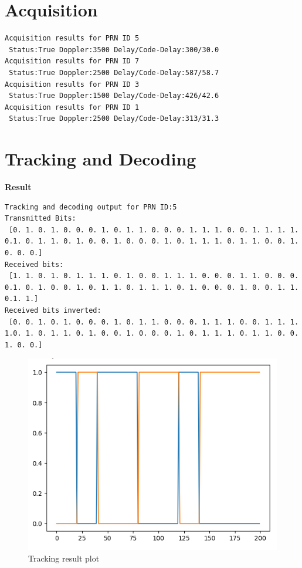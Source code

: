 
\section{Acquisition}

\begin{lstlisting}
Acquisition results for PRN ID 5
 Status:True Doppler:3500 Delay/Code-Delay:300/30.0
Acquisition results for PRN ID 7
 Status:True Doppler:2500 Delay/Code-Delay:587/58.7
Acquisition results for PRN ID 3
 Status:True Doppler:1500 Delay/Code-Delay:426/42.6
Acquisition results for PRN ID 1
 Status:True Doppler:2500 Delay/Code-Delay:313/31.3
\end{lstlisting}
\newpage
\section{Tracking and Decoding}
\textbf{Result}
\begin{lstlisting}
Tracking and decoding output for PRN ID:5
Transmitted Bits:
 [0. 1. 0. 1. 0. 0. 0. 1. 0. 1. 1. 0. 0. 0. 1. 1. 1. 0. 0. 1. 1. 1. 1. 0.1. 0. 1. 1. 0. 1. 0. 0. 1. 0. 0. 0. 1. 0. 1. 1. 1. 0. 1. 1. 0. 0. 1. 0. 0. 0.]
Received bits:
 [1. 1. 0. 1. 0. 1. 1. 1. 0. 1. 0. 0. 1. 1. 1. 0. 0. 0. 1. 1. 0. 0. 0. 0.1. 0. 1. 0. 0. 1. 0. 1. 1. 0. 1. 1. 1. 0. 1. 0. 0. 0. 1. 0. 0. 1. 1. 0.1. 1.]
Received bits inverted:
 [0. 0. 1. 0. 1. 0. 0. 0. 1. 0. 1. 1. 0. 0. 0. 1. 1. 1. 0. 0. 1. 1. 1. 1.0. 1. 0. 1. 1. 0. 1. 0. 0. 1. 0. 0. 0. 1. 0. 1. 1. 1. 0. 1. 1. 0. 0. 1. 0. 0.]
\end{lstlisting}
\begin{normalsize}
\begin{figure}[ht]
\centering
\includegraphics[width=1\columnwidth]{figs/tracking_plot.png}
\centering
\captionsetup{justification=centering}
\caption{Tracking result plot}
\label{fig:tracking_plot}
\end{figure}
\end{normalsize}






